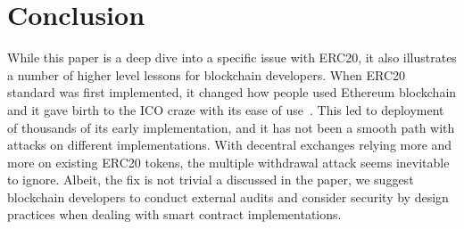 
\section{Conclusion}

While this paper is a deep dive into a specific issue with ERC20, it also illustrates a number of higher level lessons for blockchain developers. When ERC20 standard was first implemented, it changed how people used Ethereum blockchain and it gave birth to the ICO craze with its ease of use~\cite{fenu2018ico}. This led to deployment of thousands of its early implementation, and it has not been a smooth path with attacks on different implementations. With decentral exchanges relying more and more on existing ERC20 tokens, the multiple withdrawal attack seems inevitable to ignore. Albeit, the fix is not trivial a discussed in the paper, we suggest blockchain developers to conduct external audits and consider security by design practices when dealing with smart contract implementations. 



